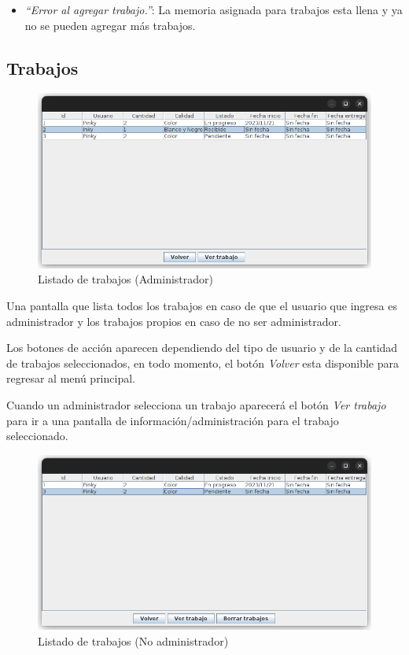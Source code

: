 \documentclass{article}
\begin{document}
\begin{itemize}
    \item \emph{``Error al agregar trabajo.''}: La memoria asignada para trabajos esta llena y ya no se pueden agregar más trabajos.
\end{itemize}

\subsection{Trabajos}

\begin{figure}[h]
    \centering
    \includegraphics[width=0.7\linewidth,keepaspectratio]{list-prints-admin.png}
    \caption{Listado de trabajos (Administrador)}
\end{figure}

Una pantalla que lista todos los trabajos en caso de que el usuario que ingresa es administrador y los trabajos propios en caso de no ser administrador.

Los botones de acción aparecen dependiendo del tipo de usuario y de la cantidad de trabajos seleccionados, en todo momento, el botón \emph{Volver} esta disponible para regresar al menú principal.

Cuando un administrador selecciona un trabajo aparecerá el botón \emph{Ver trabajo} para ir a una pantalla de información/administración para el trabajo seleccionado.

\begin{figure}[h]
    \centering
    \includegraphics[width=0.7\linewidth,keepaspectratio]{list-prints-user.png}
    \caption{Listado de trabajos (No administrador)}
\end{figure}
\end{document}
